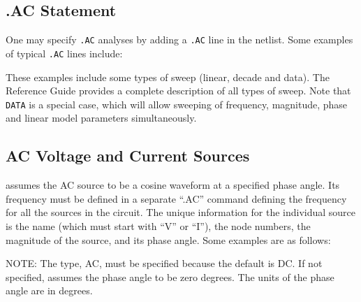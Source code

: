 \subsection{.AC Statement}

One may specify \verb|.AC| analyses by adding a \verb|.AC| line in the netlist.  
Some examples of typical \verb|.AC| lines include:


These examples include some types of sweep (linear, decade and data).  The \Xyce{} Reference Guide\ReferenceGuide{} provides a complete description of all types of sweep.  Note that \texttt{DATA} is a special case, which will allow sweeping of frequency, magnitude, phase and linear model parameters simultaneously.

\subsection{AC Voltage and Current Sources}
\label{AC_Sources}

\Xyce{} assumes the AC source to be a cosine waveform at a specified phase
angle. Its frequency must be defined in a separate ``.AC'' command defining
the frequency for all the sources in the circuit. The unique information for
the individual source is the name (which must start with ``V'' or ``I''),  the node
numbers, the magnitude of the source, and its phase angle. Some examples are as follows:


NOTE:	The type, AC, must be specified because the default is DC. If not specified, \Xyce{} assumes the
phase angle to be zero degrees.  The units of the phase angle are in degrees.

